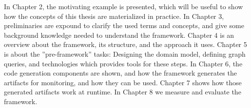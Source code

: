 In Chapter 2, the motivating example is presented, which will be useful to show how the concepts of this thesis are materialized in practice.
In Chapter 3, preliminaries are expound to clarify the used terms and concepts, and give some background knowledge needed to understand the framework.
Chapter 4 is an overview about the framework, its structure, and the approach it uses.
Chapter 5 is about the ''pre-framework'' tasks: Designing the domain model, defining graph queries, and technologies which provides tools for these steps.
In Chapter 6, the code generation components are shown, and how the framework generates the artifacts for monitoring, and how they can be used.
Chapter 7 shows how those generated artifacts work at runtime. 
In Chapter 8 we measure and evaluate the framework.
